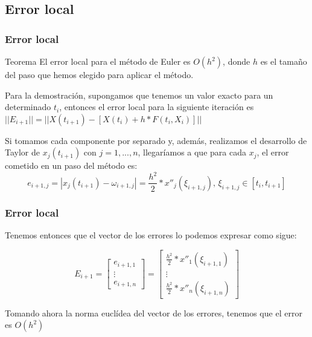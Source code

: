 \documentclass{beamer}
\begin{document}
\subsection{Error local}
\begin{frame}
	\frametitle{Error local}
	\begin{block}{Teorema}
	El error local para el método de Euler es $O(h^2)$, donde $h$ es el tamaño del paso que hemos elegido para aplicar el método.
	\end{block}
	
	Para la demostración, supongamos que tenemos un valor exacto para un determinado $t_i$, entonces el error local para la siguiente iteración es $|| E_{i+1} || = ||X(t_{i+1}) - [X(t_{i}) + h*F(t_i, X_i)] ||$
	
	Si tomamos cada componente por separado y, además, realizamos el desarrollo de Taylor de $x_j(t_{i+1})$ con $j=1,...,n$, llegaríamos a que para cada $x_j$, el error cometido en un paso del método es:
	$$ e_{i+1, j} = | x_j(t_{i+1}) - \omega_{i+1, j} | = \frac{h^2}{2}*x''_j(\xi_{i+1, j}),\, \xi_{i+1, j} \in [t_i, t_{i+1}] $$	
	
\end{frame}

\begin{frame}
	\frametitle{Error local}
	
	Tenemos entonces que el vector de los errores lo podemos expresar como sigue:
	
	\begin{equation*}
	E_{i+1}=\begin{bmatrix}
	e_{i+1, 1} \\
	\vdots \\
	e_{i+1, n}
	\end{bmatrix}=\begin{bmatrix}
	\frac{h^2}{2}*x''_1(\xi_{i+1, 1}) \\
	\vdots \\
	\frac{h^2}{2}*x''_n(\xi_{i+1, n})
	\end{bmatrix}
	\end{equation*}
	
	Tomando ahora la norma euclídea del vector de los errores, tenemos que el error es $O(h^2)$
\end{frame}
\end{document}

